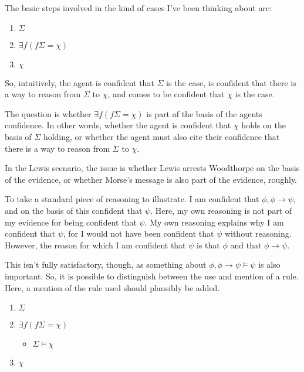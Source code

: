 \documentclass[10pt]{article}
\begin{document}
\newpage

The basic steps involved in the kind of cases I've been thinking about are:

\begin{enumerate}
\item \(\Sigma\)
\item \(\exists f(f\Sigma = \chi)\)
\item \(\chi\)
\end{enumerate}

So, intuitively, the agent is confident that \(\Sigma\) is the case, is confident that there is a way to reason from \(\Sigma\) to \(\chi\), and comes to be confident that \(\chi\) is the case.

The question is whether \(\exists f(f\Sigma = \chi)\) is part of the basis of the agents confidence.
In other words, whether the agent is confident that \(\chi\) holds on the basis of \(\Sigma\) holding, or whether the agent must also cite their confidence that there is a way to reason from \(\Sigma\) to \(\chi\).

In the Lewis scenario, the issue is whether Lewis arrests Woodthorpe on the basis of the evidence, or whether Morse's message is also part of the evidence, roughly.

To take a standard piece of reasoning to illustrate.
I am confident that \(\phi, \phi \rightarrow \psi\), and on the basis of this confident that \(\psi\).
Here, my own reasoning is not part of my evidence for being confident that \(\psi\).
My own reasoning explains why I am confident that \(\psi\), for I would not have been confident that \(\psi\) without reasoning.
However, the reason for which I am confident that \(\psi\) is that \(\phi\) and that \(\phi \rightarrow \psi\).

This isn't fully satisfactory, though, as something about \(\phi, \phi \rightarrow \psi \vDash \psi\) is also important.
So, it is possible to distinguish between the use and mention of a rule.
Here, a mention of the rule used should plausibly be added.

\begin{enumerate}
\item \(\Sigma\)
\item \(\exists f(f\Sigma = \chi)\)
  \begin{itemize}
  \item \(\Sigma \vDash \chi\)
  \end{itemize}
\item \(\chi\)
\end{enumerate}
\end{document}
